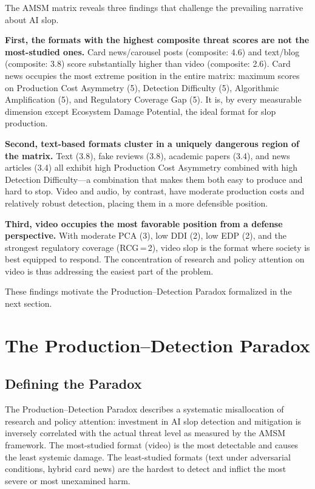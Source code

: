 \documentclass[12pt,a4paper]{article}
\begin{document}
The AMSM matrix reveals three findings that challenge the prevailing narrative about AI slop.

\textbf{First, the formats with the highest composite threat scores are not the most-studied ones.} Card news/carousel posts (composite: 4.6) and text/blog (composite: 3.8) score substantially higher than video (composite: 2.6). Card news occupies the most extreme position in the entire matrix: maximum scores on Production Cost Asymmetry (5), Detection Difficulty (5), Algorithmic Amplification (5), and Regulatory Coverage Gap (5). It is, by every measurable dimension except Ecosystem Damage Potential, the ideal format for slop production.

\textbf{Second, text-based formats cluster in a uniquely dangerous region of the matrix.} Text (3.8), fake reviews (3.8), academic papers (3.4), and news articles (3.4) all exhibit high Production Cost Asymmetry combined with high Detection Difficulty---a combination that makes them both easy to produce and hard to stop. Video and audio, by contrast, have moderate production costs and relatively robust detection, placing them in a more defensible position.

\textbf{Third, video occupies the most favorable position from a defense perspective.} With moderate PCA (3), low DDI (2), low EDP (2), and the strongest regulatory coverage (RCG\,=\,2), video slop is the format where society is best equipped to respond. The concentration of research and policy attention on video is thus addressing the easiest part of the problem.

These findings motivate the Production--Detection Paradox formalized in the next section.


\section{The Production--Detection Paradox}
\label{sec:paradox}

\subsection{Defining the Paradox}

The Production--Detection Paradox describes a systematic misallocation of research and policy attention: investment in AI slop detection and mitigation is inversely correlated with the actual threat level as measured by the AMSM framework. The most-studied format (video) is the most detectable and causes the least systemic damage. The least-studied formats (text under adversarial conditions, hybrid card news) are the hardest to detect and inflict the most severe or most unexamined harm.
\end{document}
